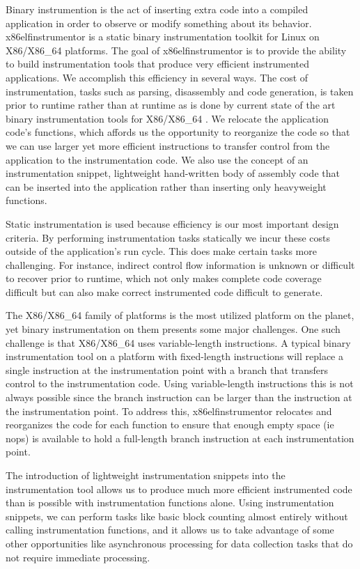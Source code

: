 Binary instrumention is the act of inserting extra code into a compiled
application in order to observe or modify something about its behavior.
x86elfinstrumentor is a static binary instrumentation toolkit for Linux on
X86/X86\_64 platforms. The goal of x86elfinstrumentor is to provide the ability to build instrumentation tools that produce very
efficient instrumented applications. We accomplish this efficiency in several ways.
The cost of instrumentation, tasks such as parsing, disassembly and code
generation, is taken prior to runtime rather than at runtime as is done by
current state of the art binary instrumentation tools for X86/X86\_64
\cite{luk2005pin, nethercote2007valgrind, dynamorio}. We relocate the
application code's functions, which affords us the opportunity to reorganize the
code so that we can use larger yet more efficient instructions to transfer
control from the application to the instrumentation code. We also use the
concept of an instrumentation snippet, lightweight hand-written body of assembly
code that can be inserted into the application rather than inserting only
heavyweight functions.

Static instrumentation is used because efficiency is our most important design 
criteria. By performing instrumentation tasks statically we incur these costs 
outside of the application's run cycle. This does make
certain tasks more challenging. For instance, indirect control flow information is unknown or
difficult to recover prior to runtime, which not only makes complete code
coverage difficult but can also make correct instrumented code difficult to
generate.

The X86/X86\_64 family of platforms is the most utilized platform on the planet,
yet binary instrumentation on them presents some major challenges. One such challenge
is that X86/X86\_64 uses variable-length instructions. A typical binary
instrumentation tool on a platform with fixed-length instructions will replace a
single instruction at the instrumentation point with a branch that transfers
control to the instrumentation code. Using variable-length instructions this
is not always possible since the branch instruction can be larger than the
instruction at the instrumentation point. To address this, x86elfinstrumentor
relocates and reorganizes the code for each function to ensure that enough empty
space (ie nops) is available to hold a full-length branch instruction at each
instrumentation point.

The introduction of lightweight instrumentation snippets into the
instrumentation tool allows us to produce much more
efficient instrumented code than is possible with instrumentation functions
alone. Using instrumentation snippets, we can perform tasks like basic block
counting almost entirely without calling instrumentation functions, and it
allows us to take advantage of some other opportunities like asynchronous
processing \cite{gao2005aliter} for data collection tasks that do not require
immediate processing.

